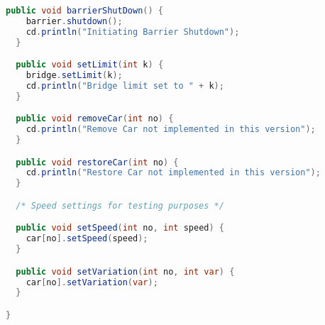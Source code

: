 \begin{lstlisting}[language=java]
  public void barrierShutDown() { 
    barrier.shutdown();
    cd.println("Initiating Barrier Shutdown");
  }

  public void setLimit(int k) { 
    bridge.setLimit(k);
    cd.println("Bridge limit set to " + k);
  }

  public void removeCar(int no) { 
    cd.println("Remove Car not implemented in this version");
  }

  public void restoreCar(int no) { 
    cd.println("Restore Car not implemented in this version");
  }

  /* Speed settings for testing purposes */

  public void setSpeed(int no, int speed) { 
    car[no].setSpeed(speed);
  }

  public void setVariation(int no, int var) { 
    car[no].setVariation(var);
  }

}







\end{lstlisting}